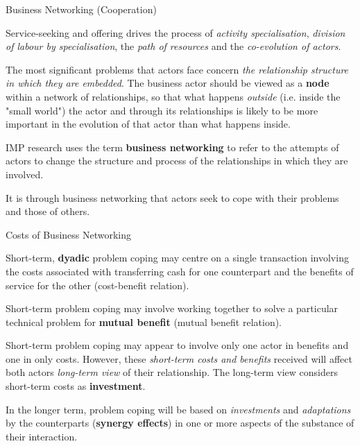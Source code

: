 \documentclass{beamer}
\begin{document}
\begin{frame}{Business Networking (Cooperation)}\small

Service-seeking and offering drives the process of \emph{activity
  specialisation}, \emph{division of labour by specialisation}, the \emph{path
  of resources} and the \emph{co-evolution of actors}.

The most signiﬁcant problems that actors face concern \emph{the relationship
  structure in which they are embedded}. The business actor should be viewed
as a \textbf{node} within a network of relationships, so that what happens
\emph{outside} (i.e. inside the "small world") the actor and through its
relationships is likely to be more important in the evolution of that actor
than what happens inside.

IMP research uses the term \textbf{business networking} to refer to the
attempts of actors to change the structure and process of the relationships in
which they are involved.

It is through business networking that actors seek to cope with their problems
and those of others.

\end{frame}

\begin{frame}{Costs of Business Networking}\small

Short-term, \textbf{dyadic} problem coping may centre on a single transaction
involving the costs associated with transferring cash for one counterpart and
the beneﬁts of service for the other (cost-benefit relation).

Short-term problem coping may involve working together to solve a particular
technical problem for \textbf{mutual beneﬁt} (mutual benefit relation).

Short-term problem coping may appear to involve only one actor in beneﬁts and
one in only costs. However, these \emph{short-term costs and beneﬁts} received
will affect both actors \emph{long-term view} of their relationship.  The
long-term view considers short-term costs as \textbf{investment}.

In the longer term, problem coping will be based on \emph{investments} and
\emph{adaptations} by the counterparts (\textbf{synergy effects}) in one or
more aspects of the substance of their interaction.

\end{frame}
\end{document}
